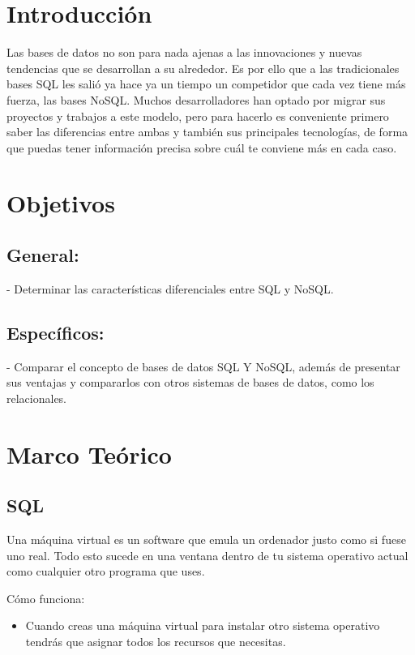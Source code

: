 \documentclass[%
 reprint,
 amsmath,amssymb,
 aps,
]{revtex4-1}
\begin{document}
\maketitle


\section {Introducción}\label{sec:1}

Las bases de datos no son para nada ajenas a las innovaciones y nuevas tendencias que se desarrollan a su alrededor. Es por ello que a las tradicionales bases SQL les salió ya hace ya un tiempo un competidor que cada vez tiene más fuerza, las bases NoSQL. Muchos desarrolladores han optado por migrar sus proyectos y trabajos a este modelo, pero para hacerlo es conveniente primero saber las diferencias entre ambas y también sus principales tecnologías, de forma que puedas tener información precisa sobre cuál te conviene más en cada caso.




\section{Objetivos}\label{sec:2}
\subsection{General:}
-  Determinar las características diferenciales entre  SQL y  NoSQL.
\subsection{Específicos:}
-  Comparar el concepto de bases de datos SQL Y  NoSQL, además de presentar sus ventajas y compararlos con otros sistemas de bases de datos, como los relacionales.



\section {Marco Teórico}\label{sec:3}

\subsection{SQL}
\par Una máquina virtual es un software que emula un ordenador justo como si fuese uno real. Todo esto sucede en una ventana dentro de tu sistema operativo actual como cualquier otro programa que uses.
\par Cómo funciona:
	\begin{itemize}
		\item Cuando creas una máquina virtual para instalar otro sistema operativo tendrás que asignar todos los recursos que necesitas.
	\end{itemize}
\end{document}
